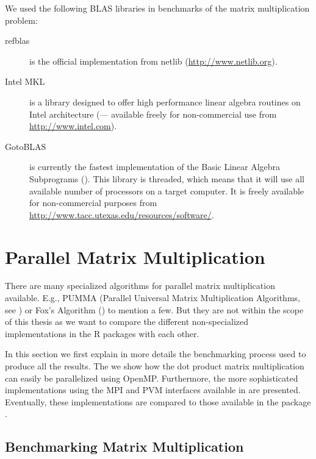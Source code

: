 We used the following BLAS libraries in benchmarks of  the matrix
multiplication problem:

\begin{description}
\item[refblas] is the official implementation from netlib
  (\url{http://www.netlib.org}).
\item[Intel MKL] is a library designed to offer high performance
  linear algebra routines on
 Intel architecture (\cite{intel07MKL}--- available
  freely for non-commercial use from \url{http://www.intel.com}). 
\item[GotoBLAS] is currently the fastest implementation of the Basic
  Linear Algebra Subprograms (\cite{goto07gotoblas}). This library is
  threaded, which means that it will use all available number of
  processors on a target computer. It is freely available for
  non-commercial purposes from
  \url{http://www.tacc.utexas.edu/resources/software/}.
\end{description}



\section{Parallel Matrix Multiplication}
\label{sec:parmm}

There are many specialized algorithms for parallel matrix multiplication
available. E.g., PUMMA (Parallel Universal Matrix Multiplication
Algorithms, see \cite{choi93pumma}) or Fox's Algorithm
(\cite{fox87mah}) to
mention a few. But they are not within the scope of this thesis
as we want to compare the different non-specialized implementations in the
R packages with each other.

In this section we first explain in more details the benchmarking process
used to produce all the results. The we show how the dot product
matrix multiplication can 
easily be parallelized using OpenMP. Furthermore, the more
sophisticated implementations using the MPI and PVM interfaces
available in  are
presented. Eventually, these implementations are compared to those
available in the package .   

\subsection{Benchmarking Matrix Multiplication}
\label{sec:benchmarkdescription}

